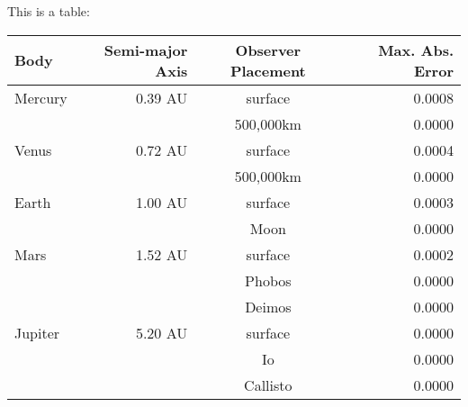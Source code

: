 This is a table:

\begin{center}
    \begin{tabular}{ l r c r}
        \toprule
        \textbf{Body} & \textbf{Semi-major Axis} & \textbf{Observer Placement} & \textbf{Max. Abs. Error} \\
        \midrule
        Mercury & 0.39 AU & surface & 0.0008 \\
        & & 500,000km & 0.0000 \\
        \midrule
        Venus & 0.72 AU & surface & 0.0004 \\
        & & 500,000km & 0.0000 \\
        \midrule
        Earth & 1.00 AU & surface & 0.0003 \\
        & & Moon & 0.0000 \\
        \midrule
        Mars & 1.52 AU & surface & 0.0002 \\
        & & Phobos & 0.0000 \\
        & & Deimos & 0.0000 \\
        \midrule
        Jupiter & 5.20 AU & surface & 0.0000 \\
        & & Io & 0.0000 \\
        & & Callisto & 0.0000 \\
        \bottomrule
    \end{tabular}
    \label{tab:table-example}
\end{center}